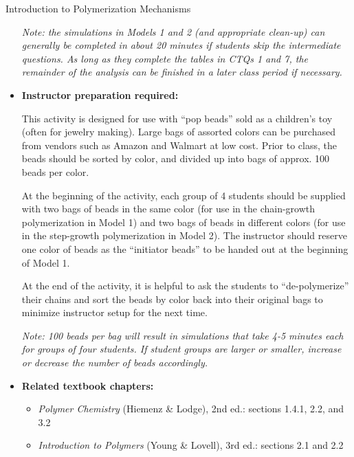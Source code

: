 \begin{activity}{Introduction to Polymerization Mechanisms}
\begin{instructornotes}
\begin{itemize}
			\emph{Note: the simulations in Models 1 and 2 (and appropriate clean-up) can generally be completed in about 20 minutes if students skip the intermediate questions.  As long as they complete the tables in CTQs 1 and 7, the remainder of the analysis can be finished in a later class period if necessary.}
			
		\item \textbf{Instructor preparation required:} 
		
			This activity is designed for use with ``pop beads'' sold as a children's toy (often for jewelry making).  Large bags of assorted colors can be purchased from vendors such as Amazon and Walmart at low cost.  Prior to class, the beads should be sorted by color, and divided up into bags of approx. 100 beads per color.
		
			At the beginning of the activity, each group of 4 students should be supplied with two bags of beads in the same color (for use in the chain-growth polymerization in Model 1) and two bags of beads in different colors (for use in the step-growth polymerization in Model 2).  The instructor should reserve one color of beads as the ``initiator beads'' to be handed out at the beginning of Model 1.
		
			At the end of the activity, it is helpful to ask the students to ``de-polymerize'' their chains and sort the beads by color back into their original bags to minimize instructor setup for the next time.
			
			\emph{Note: 100 beads per bag will result in simulations that take 4-5 minutes each for groups of four students.  If student groups are larger or smaller, increase or decrease the number of beads accordingly.}
		
		\item \textbf{Related textbook chapters:}
			\begin{itemize}
				\item \emph{Polymer Chemistry} (Hiemenz \& Lodge), 2nd ed.: sections 1.4.1, 2.2, and 3.2
				\item \emph{Introduction to Polymers} (Young \& Lovell), 3rd ed.: sections 2.1 and 2.2
			\end{itemize}
	\end{itemize}

\end{instructornotes}

\newcommand{\timeallowed}{3 minutes}

\begin{model}
\label{\labelbase:mdl:chaingrowth}


\end{model}
\end{activity}
